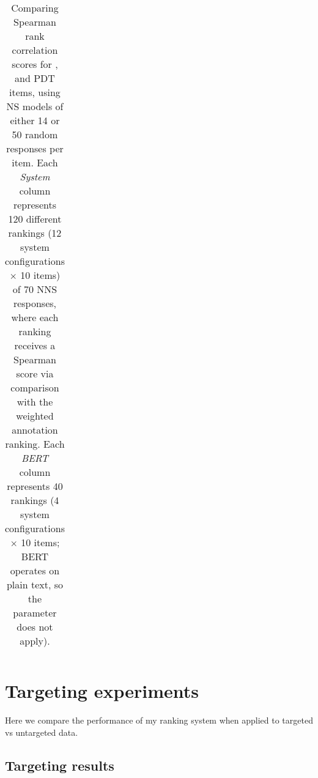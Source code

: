 \begin{table}[htb!]
\begin{center}
\begin{tabular}{|l||l|l||l|l||l|l|}
\hline
\end{tabular}
\caption{\label{tab:transitivity-results} Comparing Spearman rank correlation scores for ,  and  PDT items, using NS models of either 14 or 50 random responses per item. Each \textit{System} column represents 120 different rankings (12 system configurations $\times$ 10 items) of 70 NNS responses, where each ranking receives a Spearman score via comparison with the weighted annotation ranking. Each \textit{BERT} column represents 40 rankings (4 system configurations $\times$ 10 items; BERT operates on plain text, so the  parameter does not apply).}
\end{center}
\end{table}

\section{Targeting experiments}
\label{sec:exp-targeting}
Here we compare the performance of my ranking system when applied to targeted vs untargeted data.
\subsection{Targeting results}
\label{sec:targeting-results}


